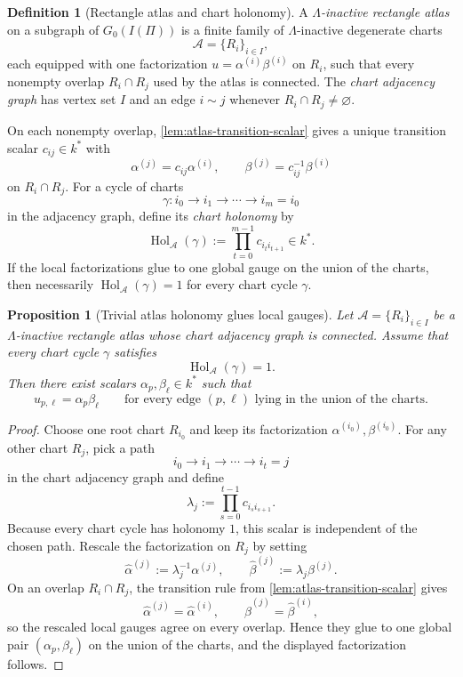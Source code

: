 \documentclass[11pt]{amsart}
\numberwithin{equation}{section}
\theoremstyle{plain}
\newtheorem{proposition}[theorem]{Proposition}
\theoremstyle{definition}
\newtheorem{definition}[theorem]{Definition}
\theoremstyle{remark}
\newcommand{\Lam}{\Lambda}
\begin{document}
\begin{definition}[Rectangle atlas and chart holonomy]
\label{def:rectangle-atlas-holonomy}
A \emph{$\Lam$-inactive rectangle atlas} on a subgraph of $G_0(I(\Pi))$ is a finite family of $\Lam$-inactive degenerate charts
\[
\mathcal A=\{R_i\}_{i\in I},
\]
each equipped with one factorization $u=\alpha^{(i)}\beta^{(i)}$ on $R_i$, such that every nonempty overlap $R_i\cap R_j$ used by the atlas is connected. The \emph{chart adjacency graph} has vertex set $I$ and an edge $i\sim j$ whenever $R_i\cap R_j\neq\varnothing$.

On each nonempty overlap, \cref{lem:atlas-transition-scalar} gives a unique transition scalar $c_{ij}\in k^*$ with
\[
\alpha^{(j)}=c_{ij}\alpha^{(i)},
\qquad
\beta^{(j)}=c_{ij}^{-1}\beta^{(i)}
\]
on $R_i\cap R_j$. For a cycle of charts
\[
\gamma: i_0\to i_1\to\cdots\to i_m=i_0
\]
in the adjacency graph, define its \emph{chart holonomy} by
\[
\operatorname{Hol}_{\mathcal A}(\gamma):=\prod_{t=0}^{m-1} c_{i_t i_{t+1}}\in k^*.
\]
If the local factorizations glue to one global gauge on the union of the charts, then necessarily $\operatorname{Hol}_{\mathcal A}(\gamma)=1$ for every chart cycle $\gamma$.
\end{definition}

\begin{proposition}[Trivial atlas holonomy glues local gauges]
\label{prop:atlas-trivial-holonomy}
Let $\mathcal A=\{R_i\}_{i\in I}$ be a $\Lam$-inactive rectangle atlas whose chart adjacency graph is connected. Assume that every chart cycle $\gamma$ satisfies
\[
\operatorname{Hol}_{\mathcal A}(\gamma)=1.
\]
Then there exist scalars $\alpha_p,\beta_\ell\in k^*$ such that
\[u_{p,\ell}=\alpha_p\beta_\ell
\qquad\text{for every edge }(p,\ell)\text{ lying in the union of the charts.}
\]
\end{proposition}

\begin{proof}
Choose one root chart $R_{i_0}$ and keep its factorization $\alpha^{(i_0)},\beta^{(i_0)}$. For any other chart $R_j$, pick a path
\[
i_0\to i_1\to\cdots\to i_t=j
\]
in the chart adjacency graph and define
\[
\lambda_j:=\prod_{s=0}^{t-1} c_{i_s i_{s+1}}.
\]
Because every chart cycle has holonomy $1$, this scalar is independent of the chosen path. Rescale the factorization on $R_j$ by setting
\[
\widehat\alpha^{(j)}:=\lambda_j^{-1}\alpha^{(j)},
\qquad
\widehat\beta^{(j)}:=\lambda_j\beta^{(j)}.
\]
On an overlap $R_i\cap R_j$, the transition rule from \cref{lem:atlas-transition-scalar} gives
\[
\widehat\alpha^{(j)}=\widehat\alpha^{(i)},
\qquad
\widehat\beta^{(j)}=\widehat\beta^{(i)},
\]
so the rescaled local gauges agree on every overlap. Hence they glue to one global pair $(\alpha_p,\beta_\ell)$ on the union of the charts, and the displayed factorization follows.
\end{proof}
\end{document}
